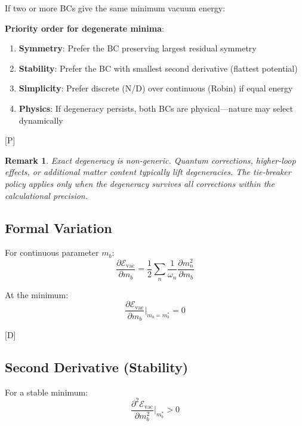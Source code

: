 \documentclass[11pt,a4paper]{article}
\newtheorem{remark}[theorem]{Remark}
\newcommand{\tagD}{\textcolor{blue!70!black}{[D]}}
\newcommand{\tagP}{\textcolor{green!50!black}{[P]}}
\begin{document}
If two or more BCs give the same minimum vacuum energy:

\begin{resultbox}
\label{box:tiebreaker}
\textbf{Priority order for degenerate minima}:
\begin{enumerate}
\item \textbf{Symmetry}: Prefer the BC preserving largest residual symmetry
\item \textbf{Stability}: Prefer the BC with smallest second derivative (flattest potential)
\item \textbf{Simplicity}: Prefer discrete (N/D) over continuous (Robin) if equal energy
\item \textbf{Physics}: If degeneracy persists, both BCs are physical---nature may select dynamically
\end{enumerate}
\tagP
\end{resultbox}

\begin{remark}
Exact degeneracy is non-generic. Quantum corrections, higher-loop effects, or
additional matter content typically lift degeneracies. The tie-breaker policy
applies only when the degeneracy survives all corrections within the calculational
precision.
\end{remark}

\subsection{Formal Variation}

For continuous parameter $m_b$:
\begin{equation}
\label{eq:vac-variation}
\frac{\partial \mathcal{E}_{\text{vac}}}{\partial m_b} = \frac{1}{2} \sum_n \frac{1}{\omega_n} \frac{\partial m_n^2}{\partial m_b}
\end{equation}

At the minimum:
\begin{equation}
\label{eq:vac-minimum}
\frac{\partial \mathcal{E}_{\text{vac}}}{\partial m_b} \bigg|_{m_b = m_b^*} = 0
\end{equation}

\tagD

\subsection{Second Derivative (Stability)}

For a stable minimum:
\begin{equation}
\label{eq:vac-stable}
\frac{\partial^2 \mathcal{E}_{\text{vac}}}{\partial m_b^2} \bigg|_{m_b^*} > 0
\end{equation}
\end{document}
